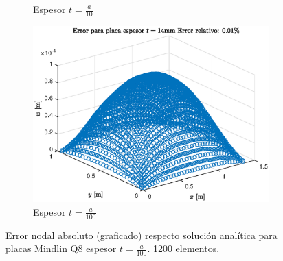 \documentclass[onecolumn,10pt,titlepage]{article}
\begin{document}
\begin{figure}[htb!]
\begin{subfigure}{.33\textwidth}
   \caption{Espesor $t=\frac{a}{10}$}
   \label{fig:Minderrort10}
 \end{subfigure}
 \begin{subfigure}{.33\textwidth}
   \centering
   \includegraphics[width=\linewidth]{fig/t100_Error.eps}
   \caption{Espesor $t=\frac{a}{100}$}
 \end{subfigure}
 \caption{Error nodal absoluto (graficado) respecto solución analítica para placas Mindlin Q8 espesor $t=\frac{a}{100}$. 1200 elementos.}
 \label{fig:Minderror}
 \end{figure}
\end{document}
